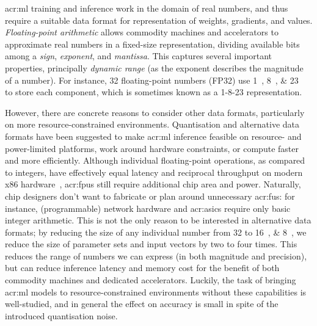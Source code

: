\gls{acr:ml} training and inference work in the domain of real numbers, and thus require a suitable data format for representation of weights, gradients, and values.
\emph{Floating-point arithmetic} allows commodity machines and accelerators to approximate real numbers in a fixed-size representation, dividing available bits among a \emph{sign}, \emph{exponent}, and \emph{mantissa}.
This captures several important properties, principally \emph{dynamic range} (as the exponent describes the magnitude of a number).
For instance, \qty{32}{\bit} floating-point numbers (FP32) use \qtylist{1; 8; 23}{\bit} to store each component, which is sometimes known as a 1-8-23 representation.

However, there are concrete reasons to consider other data formats, particularly on more resource-constrained environments.
Quantisation and alternative data formats have been suggested to make \gls{acr:ml} inference feasible on resource- and power-limited platforms, work around hardware constraints, or compute faster and more efficiently.
Although individual floating-point operations, as compared to integers, have effectively equal latency and reciprocal throughput on modern x86 hardware~\parencite{agner-x86}, \glspl{acr:fpu} still require additional chip area and power.
Naturally, chip designers don't want to fabricate or plan around unnecessary \glspl{acr:fu}: for instance, (programmable) network hardware and \glspl{acr:asic} require only basic integer arithmetic.
This is not the only reason to be interested in alternative data formats; by reducing the size of any individual number from \qty{32}{\bit} to \qtylist[list-pair-separator = { or }]{16; 8}{\bit}, we reduce the size of parameter sets and input vectors by two to four times.
This reduces the range of numbers we can express (in both magnitude and precision), but can reduce inference latency and memory cost for the benefit of both commodity machines and dedicated accelerators.
Luckily, the task of bringing \gls{acr:ml} models to resource-constrained environments without these capabilities is well-studied, and in general the effect on accuracy is small in spite of the introduced quantisation noise.

